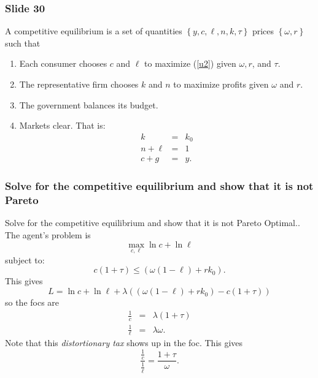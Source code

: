 \documentclass[aspectratio=169]{ltx-talk}
\begin{document}
\begin{frame}
\frametitle{Slide 30}
A competitive equilibrium is a set of quantities $\left\{ y,c,\ell ,n,k,\tau
\right\} $ prices $\left\{ \omega ,r\right\} $ such that

\begin{enumerate}
\item Each consumer chooses $c$ and $\ell $ to maximize (\ref{u2}) given $%
\omega ,r$, and $\tau $.

\item The representative firm chooses $k$ and $n$ to maximize profits given $%
\omega $ and $r.$

\item The government balances its budget.

\item Markets clear. That is:%
\begin{eqnarray*}
k &=&k_{0} \\
n+\ell &=&1 \\
c+g &=&y.
\end{eqnarray*}%
\end{enumerate}
\end{frame}

\begin{frame}
\frametitle{Solve for the competitive equilibrium and show that it is not Pareto}
Solve for the competitive equilibrium and show that it is not Pareto
Optimal.. The agent's problem is
\begin{equation*}
\underset{c,\ell }{\max }\ln c+\ln \ell
\end{equation*}%
subject to:%
\begin{equation*}
c\left( 1+\tau \right) \leq \left( \omega \left( 1-\ell \right)
+rk_{0}\right) .
\end{equation*}%
This gives%
\begin{equation*}
L=\ln c+\ln \ell +\lambda \left( \left( \omega \left( 1-\ell \right)
+rk_{0}\right) -c\left( 1+\tau \right) \right)
\end{equation*}%
so the focs are%
\begin{eqnarray*}
\frac{1}{c} &=&\lambda \left( 1+\tau \right) \\
\frac{1}{\ell } &=&\lambda \omega .
\end{eqnarray*}%
Note that this \textit{distortionary tax} shows up in the foc. This gives 
\begin{equation*}
\frac{\frac{1}{c}}{\frac{1}{\ell }}=\frac{1+\tau }{\omega }.
\end{equation*}
\end{frame}
\end{document}

